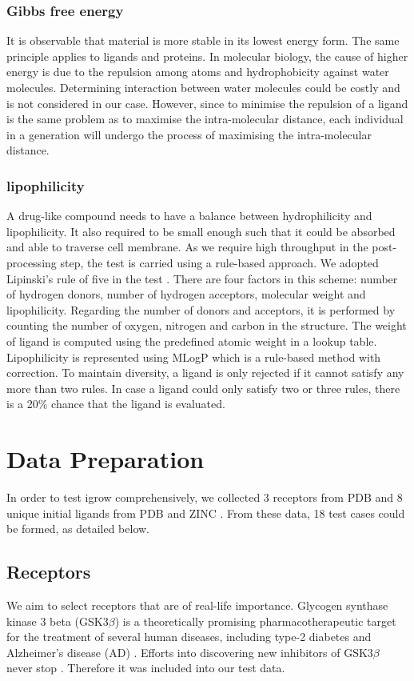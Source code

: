 \documentclass[10pt,conference,letterpaper]{IEEEtran}
\begin{document}
\subsubsection{Gibbs free energy}
It is observable that material is more stable in its lowest energy form.
The same principle applies to ligands and proteins.
In molecular biology, the cause of higher energy is due to the repulsion among atoms and hydrophobicity against water molecules.
Determining interaction between water molecules could be costly and is not considered in our case.
However, since to minimise the repulsion of a ligand is the same problem as to maximise the intra-molecular distance, each individual in a generation will undergo the process of maximising the intra-molecular distance.

\subsubsection{lipophilicity}
A drug-like compound needs to have a balance between hydrophilicity and lipophilicity.
It also required to be small enough such that it could be absorbed and able to traverse cell membrane.
As we require high throughput in the post-processing step, the test is carried using a rule-based approach.
We adopted Lipinski's rule of five in the test \cite{ref19}.
There are four factors in this scheme: number of hydrogen donors, number of hydrogen acceptors, molecular weight and lipophilicity.
Regarding the number of donors and acceptors, it is performed by counting the number of oxygen, nitrogen and carbon in the structure.
The weight of ligand is computed using the predefined atomic weight in a lookup table.
Lipophilicity is represented using MLogP which is a rule-based method with correction.
To maintain diversity, a ligand is only rejected if it cannot satisfy any more than two rules.
In case a ligand could only satisfy two or three rules, there is a 20\% chance that the ligand is evaluated.

\section{Data Preparation}\label{sec:data preparation}
In order to test igrow comprehensively, we collected 3 receptors from PDB \cite{RefWorks:96} and 8 unique initial ligands from PDB and ZINC \cite{RefWorks:55}. From these data, 18 test cases could be formed, as detailed below.

\subsection{Receptors}
We aim to select receptors that are of real-life importance. Glycogen synthase kinase 3 beta (GSK3$\beta$) is a theoretically promising pharmacotherapeutic target for the treatment of several human diseases, including type-2 diabetes \cite{RefWorks:247} and Alzheimer's disease (AD) \cite{RefWorks:248}.
Efforts into discovering new inhibitors of GSK3$\beta$ never stop \cite{RefWorks:246}.
Therefore it was included into our test data.
\end{document}
